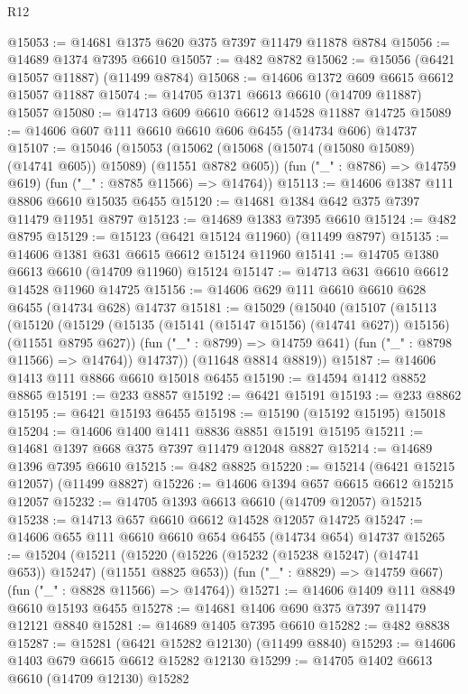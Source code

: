 \begin{lexlean}{R12}
\begin{coremodule}
{{{{{{{{{{{{{{{{{{{{{{{{{{{{{{{{{{{{{{{{{{{{{{{{{{{{{{{{{{{{{{{{{{{{{{{{{{{{{{{{{{@15053 := @14681 @1375 @620 @375 @7397 @11479 @11878 @8784
@15056 := @14689 @1374 @7395 @6610
@15057 := @482 @8782
@15062 := @15056 (@6421 @15057 @11887) (@11499 @8784)
@15068 := @14606 @1372 @609 @6615 @6612 @15057 @11887
@15074 := @14705 @1371 @6613 @6610 (@14709 @11887) @15057
@15080 := @14713 @609 @6610 @6612 @14528 @11887 @14725
@15089 := @14606 @607 @111 @6610 @6610 @606 @6455 (@14734 @606) @14737
@15107 := @15046
    (@15053
      (@15062 (@15068 (@15074 (@15080 @15089) (@14741 @605)) @15089) (@11551 @8782 @605))
      (fun ("_" : @8786) => @14759 @619)
      (fun ("_" : @8785 @11566) => @14764))
@15113 := @14606 @1387 @111 @8806 @6610 @15035 @6455
@15120 := @14681 @1384 @642 @375 @7397 @11479 @11951 @8797
@15123 := @14689 @1383 @7395 @6610
@15124 := @482 @8795
@15129 := @15123 (@6421 @15124 @11960) (@11499 @8797)
@15135 := @14606 @1381 @631 @6615 @6612 @15124 @11960
@15141 := @14705 @1380 @6613 @6610 (@14709 @11960) @15124
@15147 := @14713 @631 @6610 @6612 @14528 @11960 @14725
@15156 := @14606 @629 @111 @6610 @6610 @628 @6455 (@14734 @628) @14737
@15181 := @15029
    (@15040
      (@15107
        (@15113
          (@15120
            (@15129 (@15135 (@15141 (@15147 @15156) (@14741 @627)) @15156) (@11551 @8795 @627))
            (fun ("_" : @8799) => @14759 @641)
            (fun ("_" : @8798 @11566) => @14764))
          @14737))
      (@11648 @8814 @8819))
@15187 := @14606 @1413 @111 @8866 @6610 @15018 @6455
@15190 := @14594 @1412 @8852 @8865
@15191 := @233 @8857
@15192 := @6421 @15191
@15193 := @233 @8862
@15195 := @6421 @15193 @6455
@15198 := @15190 (@15192 @15195) @15018
@15204 := @14606 @1400 @1411 @8836 @8851 @15191 @15195
@15211 := @14681 @1397 @668 @375 @7397 @11479 @12048 @8827
@15214 := @14689 @1396 @7395 @6610
@15215 := @482 @8825
@15220 := @15214 (@6421 @15215 @12057) (@11499 @8827)
@15226 := @14606 @1394 @657 @6615 @6612 @15215 @12057
@15232 := @14705 @1393 @6613 @6610 (@14709 @12057) @15215
@15238 := @14713 @657 @6610 @6612 @14528 @12057 @14725
@15247 := @14606 @655 @111 @6610 @6610 @654 @6455 (@14734 @654) @14737
@15265 := @15204
    (@15211
      (@15220 (@15226 (@15232 (@15238 @15247) (@14741 @653)) @15247) (@11551 @8825 @653))
      (fun ("_" : @8829) => @14759 @667)
      (fun ("_" : @8828 @11566) => @14764))
@15271 := @14606 @1409 @111 @8849 @6610 @15193 @6455
@15278 := @14681 @1406 @690 @375 @7397 @11479 @12121 @8840
@15281 := @14689 @1405 @7395 @6610
@15282 := @482 @8838
@15287 := @15281 (@6421 @15282 @12130) (@11499 @8840)
@15293 := @14606 @1403 @679 @6615 @6612 @15282 @12130
@15299 := @14705 @1402 @6613 @6610 (@14709 @12130) @15282
}}}}}}}}}}}}}}}}}}}}}}}}}}}}}}}}}}}}}}}}}}}}}}}}}}}}}}}}}}}}}}}}}}}}}}}}}}}}}}}}}}
\end{coremodule}
\end{lexlean}
